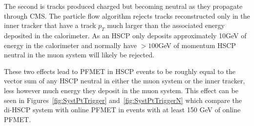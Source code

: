 The second is tracks produced charged but
becoming neutral as they propagate through CMS.
The particle flow algorithm rejects tracks reconstructed only in the inner tracker that have a track $p_T$ much larger
than the associated energy deposited in the calorimeter. As an HSCP only deposits approximately 10GeV of energy in the calorimeter and normally have $> 100$GeV of momentum
HSCP neutral in the muon system will likely be rejected. 

These two effects lead to PFMET in HSCP events to be roughly equal to the vector sum of any HSCP neutral in
either the muon system or the inner tracker, less however much energy they deposit in the muon system. This effect can be seen in Figures~\ref{fig:SystPtTrigger} 
and~\ref{fig:SystPtTriggerN} which compare the di-HSCP system with online PFMET in events with at least 150 GeV of online PFMET.

